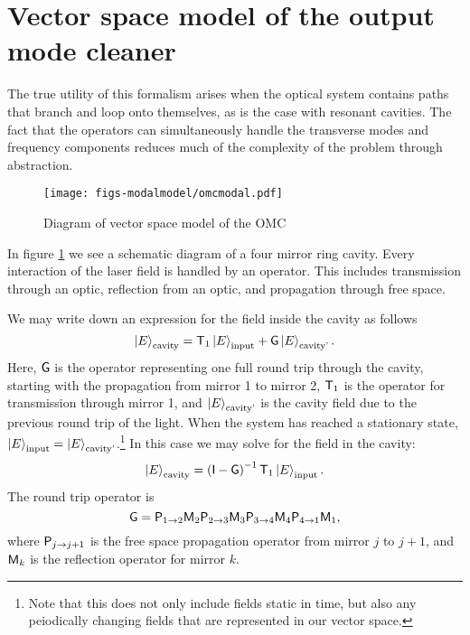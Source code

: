\section{Vector space model of the output mode cleaner}
The true utility of this formalism arises when the optical system contains paths that branch and loop onto themselves, as is the case with resonant cavities. %
The fact that the operators can simultaneously handle the transverse modes and frequency components reduces much of the complexity of the problem through abstraction.
\begin{figure}
  \begin{center}
  \leavevmode
  \texttt{[image: figs-modalmodel/omcmodal.pdf]}
  \end{center}
  \caption[Diagram of vector space model of the OMC]{Diagram of vector space model of the OMC}
  \label{fig:omcmodal}
\end{figure}
In figure \ref{fig:omcmodal} we see a schematic diagram of a four mirror ring cavity. %
Every interaction of the laser field is handled by an operator. %
This includes transmission through an optic, reflection from an optic, and propagation through free space. %


We may write down an expression for the field inside the cavity as follows
\begin{equation}
\left| E \right>_{\text{cavity}} = \mathsf{T}_1\left| E \right>_{\text{input}}+\mathsf{G}\left| E \right>_{\text{cavity'}}.
\end{equation}
Here, $\mathsf{G}$ is the operator representing one full round trip through the cavity, starting with the propagation from mirror 1 to mirror 2, $\mathsf{T}_1$ is the operator for transmission through mirror 1, and $\left| E \right>_{\text{cavity'}}$ is the cavity field due to the previous round trip of the light. %
When the system has reached a stationary state, $\left| E \right>_{\text{input}}=\left| E \right>_{\text{cavity'}}$.\footnote{Note that this does not only include fields static in time, but also any peiodically changing fields that are represented in our vector space.} In this case we may solve for the field in the cavity:
\begin{equation}
\left| E \right>_{\text{cavity}} = \left(\mathsf{I}-\mathsf{G}\right)^{-1}\mathsf{T}_1\left| E \right>_{\text{input}}.
\end{equation}
The round trip operator is 
\begin{equation}
\mathsf{G} = \mathsf{P}_{1\rightarrow 2}\mathsf{M}_2\mathsf{P}_{2\rightarrow 3}\mathsf{M}_3\mathsf{P}_{3\rightarrow 4}\mathsf{M}_4\mathsf{P}_{4\rightarrow 1}\mathsf{M}_1,
\end{equation}
where $\mathsf{P}_{j\rightarrow j+1}$ is the free space propagation operator from mirror $j$ to $j+1$, and $\mathsf{M}_k$ is the reflection operator for mirror $k$.

